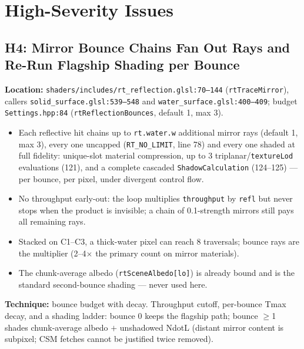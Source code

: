 \documentclass[11pt,a4paper]{article}
\begin{document}
\section{High-Severity Issues}

\subsection{H4: Mirror Bounce Chains Fan Out Rays and Re-Run Flagship Shading per Bounce}

\textbf{Location:} \texttt{shaders/includes/rt\_reflection.glsl:70--144} (\texttt{rtTraceMirror}), callers \texttt{solid\_surface.glsl:539--548} and \texttt{water\_surface.glsl:400--409}; budget \texttt{Settings.hpp:84} (\texttt{rtReflectionBounces}, default 1, max 3).

\begin{itemize}
    \item Each reflective hit chains up to \texttt{rt.water.w} additional mirror rays (default 1, max 3), every one uncapped (\texttt{RT\_NO\_LIMIT}, line 78) and every one shaded at full fidelity: unique-slot material compression, up to 3 triplanar/\texttt{textureLod} evaluations (121), and a complete cascaded \texttt{ShadowCalculation} (124--125) --- per bounce, per pixel, under divergent control flow.
    \item No throughput early-out: the loop multiplies \texttt{throughput} by \texttt{refl} but never stops when the product is invisible; a chain of 0.1-strength mirrors still pays all remaining rays.
    \item Stacked on C1--C3, a thick-water pixel can reach 8 traversals; bounce rays are the multiplier (2--4$\times$ the primary count on mirror materials).
    \item The chunk-average albedo (\texttt{rtSceneAlbedo[lo]}) is already bound and is the standard second-bounce shading --- never used here.
\end{itemize}

\textbf{Technique:} bounce budget with decay. Throughput cutoff, per-bounce Tmax decay, and a shading ladder: bounce 0 keeps the flagship path; bounce $\geq$1 shades chunk-average albedo $+$ unshadowed NdotL (distant mirror content is subpixel; CSM fetches cannot be justified twice removed).
\end{document}

